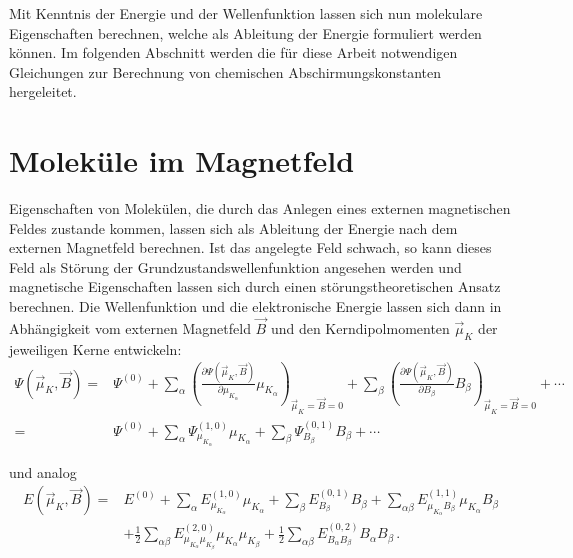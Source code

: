 Mit Kenntnis der Energie und der Wellenfunktion lassen sich nun molekulare Eigenschaften berechnen, welche als Ableitung der Energie formuliert werden können. Im folgenden Abschnitt werden die für diese Arbeit notwendigen Gleichungen zur Berechnung von chemischen Abschirmungskonstanten hergeleitet.    


\section{Moleküle im Magnetfeld}\label{kap:magnetfeld}

Eigenschaften von Molekülen, die durch das Anlegen eines externen magnetischen Feldes zustande kommen, lassen sich als Ableitung der Energie nach dem externen Magnetfeld berechnen. Ist das angelegte Feld schwach, so kann dieses Feld als Störung der Grundzustandswellenfunktion angesehen werden und magnetische Eigenschaften lassen sich durch einen störungstheoretischen Ansatz berechnen. Die Wellenfunktion und die elektronische Energie lassen sich dann in Abhängigkeit vom externen Magnetfeld $\vec{B}$ und den Kerndipolmomenten $\vec{\mu}_K$ der jeweiligen Kerne entwickeln:\supercite{ditchfield1974self} 
\begingroup
\small
\begin{equation}
\begin{aligned}
\Psi(\vec{\mu}_K,\vec{B})=&\Psi^{(0)}+\sum_{\alpha}\left(\frac{\partial\Psi(\vec{\mu}_K,\vec{B})}{\partial \mu_{K_\alpha}}\mu_{K_\alpha}\right)_{\vec{\mu}_K=\vec{B}=0}+\sum_\beta\left(\frac{\partial\Psi(\vec{\mu}_K,\vec{B})}{\partial B_\beta}B_\beta\right)_{\vec{\mu}_K=\vec{B}=0}+\cdots\\
=&\Psi^{(0)}+\sum_{\alpha}\Psi_{\mu_{K_\alpha}}^{(1,0)}\mu_{K_\alpha}+\sum_\beta\Psi_{B_\beta}^{(0,1)}B_\beta+\cdots
\end{aligned}
\end{equation}
\endgroup

und analog
\begin{equation}\label{eq:evonbmu0}
\begin{aligned}
E(\vec{\mu}_K,\vec{B})=&E^{(0)}+\sum_{\alpha} E^{(1,0)}_{\mu_{K_\alpha}} \mu_{K_\alpha}+\sum_\beta E^{(0,1)}_{B_\beta} B_\beta+\sum_{\alpha\beta} E^{(1,1)}_{\mu_{K_\alpha}B_\beta} \mu_{K_\alpha}B_\beta\\
&+\frac{1}{2}\sum_{\alpha\beta} E^{(2,0)}_{\mu_{K_\alpha}\mu_{K_\beta}}\mu_{K_\alpha}\mu_{K_\beta}+\frac{1}{2}\sum_{\alpha\beta} E^{(0,2)}_{B_\alpha B_\beta}B_\alpha B_\beta\, .
\end{aligned}
\end{equation}

